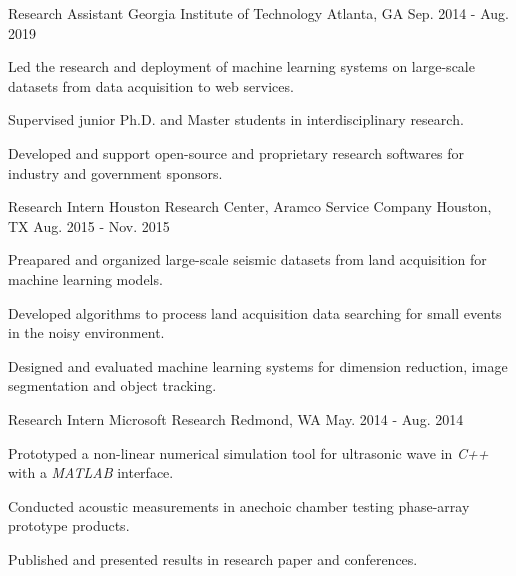 \begin{cventries}
	\cventry
		{Research Assistant} %
		{Georgia Institute of Technology} %
		{Atlanta, GA} %
		{Sep. 2014 - Aug. 2019} %
		{
			\begin{cvitems} %
				\item {Led the research and deployment of machine learning systems on large-scale datasets from data acquisition to web services.}
				\item {Supervised junior Ph.D. and Master students in interdisciplinary research.}
				\item {Developed and support open-source and proprietary research softwares for industry and government sponsors.}
			\end{cvitems}
		}

	\cventry
		{Research Intern} %
		{Houston Research Center, Aramco Service Company} %
		{Houston, TX} %
		{Aug. 2015 - Nov. 2015} %
		{
			\begin{cvitems} %
				\item {Preapared and organized large-scale seismic datasets from land acquisition for machine learning models.}
				\item {Developed algorithms to process land acquisition data searching for small events in the noisy environment.}
				\item {Designed and evaluated machine learning systems for dimension reduction, image segmentation and object tracking.}
			\end{cvitems}
		}

	\cventry
		{Research Intern} %
		{Microsoft Research} %
		{Redmond, WA} %
		{May. 2014 - Aug. 2014} %
		{
			\begin{cvitems} %
				\item {Prototyped a non-linear numerical simulation tool for ultrasonic wave in \textit{C++} with a \textit{MATLAB} interface.}
				\item {Conducted acoustic measurements in anechoic chamber testing phase-array prototype products.}
				\item {Published and presented results in research paper and conferences.}
			\end{cvitems}
		}


\end{cventries}

